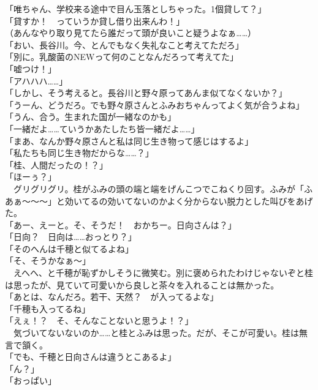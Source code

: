 「唯ちゃん、学校来る途中で目ん玉落としちゃった。1個貸して？」\\
「貸すか！　っていうか貸し借り出来んわ！」\\

（あんなやり取り見てたら誰だって頭が良いこと疑うよなぁ……）\\

「おい、長谷川。今、とんでもなく失礼なこと考えてただろ」\\
「別に。乳酸菌のNEWって何のことなんだろって考えてた」\\
「嘘つけ！」\\
「アハハハ……」\\
「しかし、そう考えると。長谷川と野々原ってあんま似てなくないか？」\\
「うーん、どうだろ。でも野々原さんとふみおちゃんってよく気が合うよね」\\
「うん、合う。生まれた国が一緒なのかも」\\
「一緒だよ……ていうかあたしたち皆一緒だよ……」\\
「まあ、なんか野々原さんと私は同じ生き物って感じはするよ」\\
「私たちも同じ生き物だからな……？」\\
「桂、人間だったの！？」\\
「ほーぅ？」\\
　グリグリグリ。桂がふみの頭の端と端をげんこつでこねくり回す。ふみが「ふあぁ～～～」と効いてるの効いてないのかよく分からない脱力とした叫びをあげた。\\
「あー、えーと。そ、そうだ！　おかちー。日向さんは？」\\
「日向？　日向は……おっとり？」\\
「そのへんは千穂と似てるよね」\\
「そ、そうかなぁ～」\\
　えへへ、と千穂が恥ずかしそうに微笑む。別に褒められたわけじゃないぞと桂は思ったが、見ていて可愛いから良しと茶々を入れることは無かった。\\
「あとは、なんだろ。若干、天然？　が入ってるよな」\\
「千穂も入ってるね」\\
「えぇ！？　そ、そんなことないと思うよ！？」\\
　気づいてないないのか……と桂とふみは思った。だが、そこが可愛い。桂は無言で頷く。\\
「でも、千穂と日向さんは違うとこあるよ」\\
「ん？」\\
「おっぱい」\\
